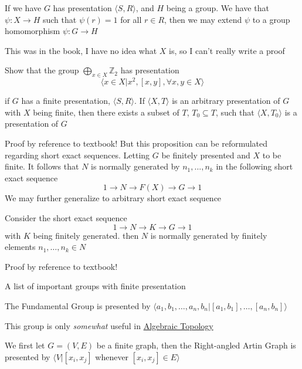 \begin{lemma}
    If we have $G$ has presentation $\langle S,R\rangle$, and $H$ being a group. We have that $\psi:X\to H$ such that $\psi(r) = 1$ for all $r\in R$, then we may extend $\psi$ to a group homomorphism $\psi: G\to H$ 
\end{lemma}
This was in the book, I have no idea what $X$ is, so I can't really write a proof 
\hypertarget{Exec1_44}{}
\begin{exercise}
    Show that the group $\bigoplus_{x\in X}\mathbb{Z}_2$ has presentation
    \[\langle x\in X\vert x^2,[x,y],\forall x,y\in X\rangle\]
\end{exercise}





\begin{proposition}
    if $G$ has a finite presentation, $\langle S,R\rangle$. If $\langle X,T\rangle$ is an arbitrary presentation of $G$ with $X$ being finite, then there exists a subset of $T$, $T_0\subseteq T$, such that $\langle X,T_0\rangle$ is a presentation of $G$
\end{proposition}
Proof by reference to textbook! But this proposition can be reformulated regarding short exact sequences. Letting $G$ be finitely presented and $X$ to be finite. It follows that $N$ is normally generated by $n_1,\ldots,n_k$ in the following short exact sequence
\[1\to N\to F(X)\to G\to1\]
We may further generalize to arbitrary short exact sequence
\begin{lemma}
    Consider the short exact sequence
    \[1\to N\to K\to G\to1\]
    with $K$ being finitely generated. then $N$ is normally generated by finitely elements $n_1,\ldots,n_k\in N$
\end{lemma}
Proof by reference to textbook!

A list of important groups with finite presentation


\begin{example}
    
         The Fundamental Group is presented by $\langle a_1,b_1,\ldots,a_n,b_n\vert [a_1,b_1],\ldots,[a_n,b_n]\rangle $
\end{example}
This group is only \textit{somewhat} useful in \href{https://en.wikipedia.org/wiki/Algebraic_topology}{Algebraic Topology}
\begin{example}
    We first let $G=(V,E)$ be a finite graph, then the Right-angled Artin Graph is presented by $\langle V\vert [x_i,x_j] $ whenever $[x_i,x_j]\in E\rangle$
\end{example}
